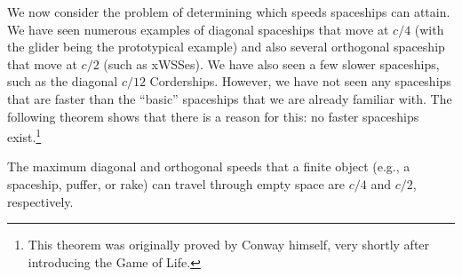 We now consider the problem of determining which speeds spaceships can attain. We have seen numerous examples of diagonal spaceships that move at $c/4$ (with the glider being the prototypical example) and also several orthogonal spaceship that move at $c/2$ (such as xWSSes). We have also seen a few slower spaceships, such as the diagonal $c/12$ Corderships. However, we have not seen any spaceships that are faster than the ``basic'' spaceships that we are already familiar with. The following theorem shows that there is a reason for this: no faster spaceships exist.\footnote{This theorem was originally proved by Conway himself, very shortly after introducing the Game of Life.}

\begin{theorem}\label{thm:speed_limits}
	The maximum diagonal and orthogonal speeds that a finite object (e.g., a spaceship, puffer, or rake) can travel through empty space are $c/4$ and $c/2$, respectively.
\end{theorem}

